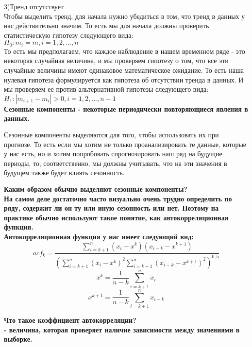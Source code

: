 \documentclass[12pt,a4paper]{paper}
\begin{document}
3)Тренд отсутствует\\

Чтобы выделить тренд, для начала нужно убедиться в том, что тренд в данных у нас действительно значим. То есть мы для начала должны проверить статистическую гипотезу следующего вида:\\

$H_0: m_i=m, i=1,2,...,n$\\

То есть мы предполагаем, что каждое наблюдение в нашем временном ряде - это некоторая случайная величина, и мы проверяем гипотезу о том, что все эти случайные величины имеют одинаковое математическое ожидание. То есть наша нулевая гипотеза формулируется как гипотеза об отсутствии тренда в данных. И мы проверяем ее против альтернативной гипотезы следующего вида:\\

$H_1: |m_{i+1}-m_i|>0, i=1,2,...,n-1$\\

\bfseries{Сезонные компоненты} \mdseries - некоторые периодически повторяющиеся явления в данных.

Сезонные компоненты выделяются для того, чтобы использовать их при прогнозе. То есть если мы хотим не только проанализировать те данные, которые у нас есть, но и хотим попробовать спрогнозировать наш ряд на будущие периоды, то, соответственно, мы должны учитывать, что на эти значения в будущем также будет влиять сезонность.\\

\newpage

\bfseries{Каким образом обычно выделяют сезонные компоненты?} \mdseries\\

На самом деле достаточно часто визуально очень трудно определить по ряду, содержит ли он ту или иную сезонность или нет. Поэтому на практике обычно используют такое понятие, как автокорреляционная функция.\\

Автокорреляционная функция у нас имеет следующий вид:\\
$$ acf_k = \frac{\sum_{i=k+1}^{n}(x_i-x^k)(x_{i-k}-x^{k+1})}{(\sum_{i=k+1}^{n}(x_i-x^k)^2 \sum_{i=k+1}^{n}(x_{i-k}-x^{k+1})^2)^{0,5}}$$
$$x^k=\frac{1}{n-k}\sum_{i=k+1}^{n}x_i$$
$$x^{k+1}=\frac{1}{n-k}\sum_{i=k+1}^{n}x_{i-k}$$

\bfseries{Что такое коэффициент автокорреляции?} \mdseries\\

- величина, которая проверяет наличие зависимости между значениями в выборке.\\
\end{document}
